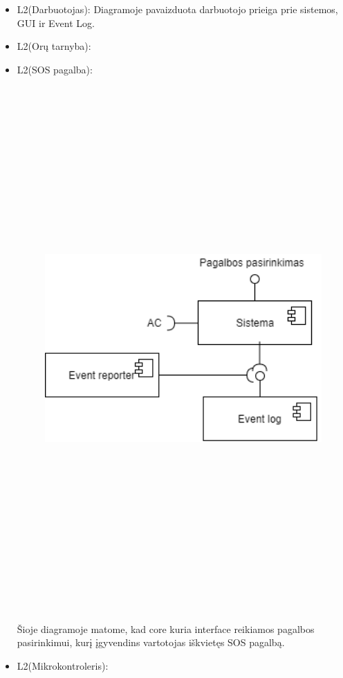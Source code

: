 \documentclass[oneside]{VUMIFPSkursinis}
\begin{document}
\begin{itemize}
\begin{figure}[H]
	\caption{}
	\label{fig:}
\end{figure}
\item L2(Darbuotojas): Diagramoje pavaizduota darbuotojo prieiga prie sistemos, GUI ir Event Log. 
\item L2(Orų tarnyba):
\item L2(SOS pagalba):
	\begin{figure}[H]
		\centering	
	\includegraphics[width=17cm,height=20cm,keepaspectratio]{L2SOS.png}
	\caption{}
	\label{fig:L2SOS}
\end{figure}
Šioje diagramoje matome, kad core kuria interface reikiamos pagalbos pasirinkimui, kurį įgyvendins vartotojas iškvietęs SOS pagalbą.
\item L2(Mikrokontroleris):

\end{itemize}
\end{document}
